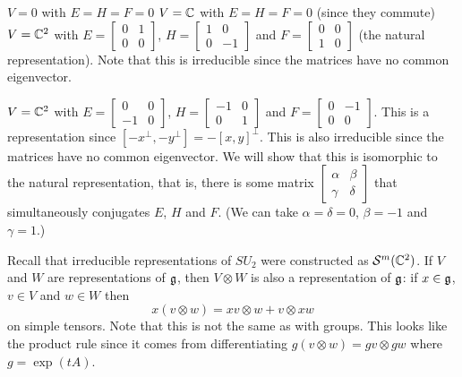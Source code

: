 \begin{exam}
  \lv
  \begin{enum}
    \io $V=0$ with $E=H=F=0$
    \io $V=\mathbb{C}$ with $E=H=F=0$ (since they commute)
    \io $V=\mathbb{C}^2$ with
    $E=
    \left[ 
      \begin{smallmatrix}
	0 & 1 \\ 0 & 0
      \end{smallmatrix}
    \right]
    $,
    $H=
    \left[ 
      \begin{smallmatrix}
	1 & 0 \\ 0 & -1
      \end{smallmatrix}
    \right]
    $ and
    $F=
    \left[ 
      \begin{smallmatrix}
	0 & 0 \\ 1 & 0
      \end{smallmatrix}
    \right]
    $ (the natural representation).
    Note that this is irreducible since the matrices have no common eigenvector.

    \io $V=\mathbb{C}^2$ with
    $E=
    \left[ 
      \begin{smallmatrix}
	0 & 0 \\ -1 & 0
      \end{smallmatrix}
    \right]
    $,
    $H=
    \left[ 
      \begin{smallmatrix}
	-1 & 0 \\ 0 & 1
      \end{smallmatrix}
    \right]
    $ and
    $F=
    \left[ 
      \begin{smallmatrix}
	0 & -1 \\ 0 & 0
      \end{smallmatrix}
    \right]
    $.
    This is a representation since $[-x^\perp,-y^\perp]=-[x,y]^\perp$.
    This is also irreducible since the matrices have no common eigenvector.
    We will show that this is isomorphic to the natural representation, that is, there is some matrix
    $\left[
    \begin{smallmatrix}
      \alpha & \beta \\ \gamma & \delta
    \end{smallmatrix}
    \right]$
    that simultaneously conjugates $E$, $H$ and $F$.
    (We can take $\alpha=\delta=0$, $\beta=-1$ and $\gamma=1$.)
  \end{enum}
  Recall that irreducible representations of $SU_2$ were constructed as $\mathcal{S}^m(\mathbb{C}^2)$.
  If $V$ and $W$ are representations of $\mathfrak{g}$, then $V \otimes W$ is also a representation of $\mathfrak{g}$: if $x \in \mathfrak{g}$, $v \in V$ and $w \in W$ then
  \[ x(v \otimes w) = xv \otimes w + v \otimes xw \]
  on simple tensors.
  Note that this is not the same as with groups.
  This looks like the product rule since it comes from differentiating $g(v \otimes w) = gv \otimes gw$ where $g=\exp(tA)$.
\end{exam}
